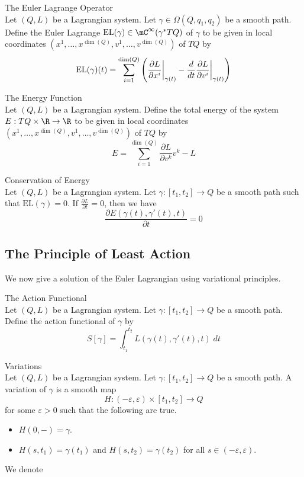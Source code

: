 \documentclass[a4paper]{article}
\begin{document}
\begin{defn}{The Euler Lagrange Operator}{}\\
Let $(Q,L)$ be a Lagrangian system. Let $\gamma\in\Omega(Q,q_1,q_2)$ be a smooth path. Define the Euler Lagrange $\text{EL}(\gamma)\in\mC^\infty(\gamma^\ast TQ)$ of $\gamma$ to be given in local coordinates $(x^1,\dots,x^{\dim(Q)},v^1,\dots,v^{\dim(Q)})$ of $TQ$ by $$\text{EL}(\gamma)(t)=\sum_{i=1}^{\dim(Q)}\left(\frac{\partial L}{\partial x^i}\bigg{|}_{\gamma(t)}-\frac{d}{dt}\frac{\partial L}{\partial v^i}\bigg{|}_{\gamma(t)}\right)$$
\end{defn}

\begin{defn}{The Energy Function}{}\\
Let $(Q,L)$ be a Lagrangian system. Define the total energy of the system $E:TQ\times\R\to\R$ to be given in local coordinates $(x^1,\dots,x^{\dim(Q)},v^1,\dots,v^{\dim(Q)})$ of $TQ$ by $$E=\sum_{i=1}^{\dim(Q)}\frac{\partial L}{\partial v^k}v^k-L$$
\end{defn}

\begin{thm}{Conservation of Energy}{}\\
Let $(Q,L)$ be a Lagrangian system. Let $\gamma:[t_1,t_2]\to Q$ be a smooth path such that $\text{EL}(\gamma)=0$. If $\frac{\partial L}{\partial t}=0$, then we have $$\frac{\partial E(\gamma(t),\gamma'(t),t)}{\partial t}=0$$
\end{thm}

\subsection{The Principle of Least Action}
We now give a solution of the Euler Lagrangian using variational principles. 

\begin{defn}{The Action Functional}{}\\
Let $(Q,L)$ be a Lagrangian system. Let $\gamma:[t_1,t_2]\to Q$ be a smooth path. Define the action functional of $\gamma$ by $$S[\gamma]=\int_{t_1}^{t_2}L(\gamma(t),\gamma'(t),t)\;dt$$
\end{defn}

\begin{defn}{Variations}{}\\
Let $(Q,L)$ be a Lagrangian system. Let $\gamma:[t_1,t_2]\to Q$ be a smooth path. A variation of $\gamma$ is a smooth map $$H:(-\varepsilon,\varepsilon)\times[t_1,t_2]\to Q$$ for some $\varepsilon>0$ such that the following are true. 
\begin{itemize}
\item $H(0,-)=\gamma$. 
\item $H(s,t_1)=\gamma(t_1)$ and $H(s,t_2)=\gamma(t_2)$ for all $s\in(-\varepsilon,\varepsilon)$. 
\end{itemize}
We denote
\end{defn}
\end{document}
